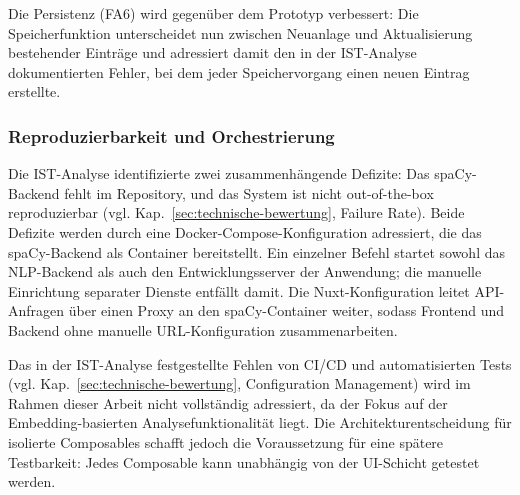 Die Persistenz (FA6) wird gegenüber dem Prototyp verbessert: Die Speicherfunktion unterscheidet nun zwischen Neuanlage und Aktualisierung bestehender Einträge und adressiert damit den in der IST-Analyse dokumentierten Fehler, bei dem jeder Speichervorgang einen neuen Eintrag erstellte.

\subsubsection{Reproduzierbarkeit und Orchestrierung}\label{sec:orchestrierung}

Die IST-Analyse identifizierte zwei zusammenhängende Defizite: Das spaCy-Backend fehlt im Repository, und das System ist nicht out-of-the-box reproduzierbar (vgl. Kap.~\ref{sec:technische-bewertung}, Failure Rate).
Beide Defizite werden durch eine Docker-Compose-Konfiguration adressiert, die das spaCy-Backend als Container bereitstellt.
Ein einzelner Befehl startet sowohl das NLP-Backend als auch den Entwicklungsserver der Anwendung; die manuelle Einrichtung separater Dienste entfällt damit.
Die Nuxt-Konfiguration leitet API-Anfragen über einen Proxy an den spaCy-Container weiter, sodass Frontend und Backend ohne manuelle URL-Konfiguration zusammenarbeiten.

Das in der IST-Analyse festgestellte Fehlen von CI/CD und automatisierten Tests (vgl. Kap.~\ref{sec:technische-bewertung}, Configuration Management) wird im Rahmen dieser Arbeit nicht vollständig adressiert, da der Fokus auf der Embedding-basierten Analysefunktionalität liegt.
Die Architekturentscheidung für isolierte Composables schafft jedoch die Voraussetzung für eine spätere Testbarkeit: Jedes Composable kann unabhängig von der UI-Schicht getestet werden.
